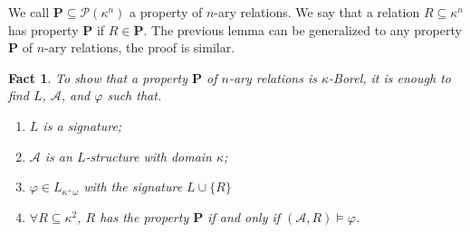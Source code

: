 \documentclass[12pt,a4paper]{amsart}
\newtheorem{fact}[thm]{Fact}
\theoremstyle{definition}
\theoremstyle{remark}
\begin{document}
We call $\mathbf{P}\subseteq\mathcal{P}(\kappa^n)$ a property of $n$-ary relations. We say that a relation $R\subseteq \kappa^n$ has  property $\mathbf{P}$  if $R\in \mathbf{P}$.
The previous lemma can be generalized to any  property $\mathbf{P}$ of $n$-ary relations, the proof is similar.

\begin{fact}
    To show that a property $\mathbf{P}$ of $n$-ary relations is $\kappa$-Borel, it is enough to find $L$, $\mathcal{A}$, and $\varphi$ such that.
    \begin{enumerate}
        \item $L$ is a signature;
        \item $\mathcal{A}$ is an $L$-structure with domain $\kappa$;
        \item $\varphi\in L_{\kappa^+\omega}$ with the signature $L\cup \{R\}$
        \item $\forall R\subseteq \kappa^2$, $R$ has the property $\mathbf{P}$ if and only if $(\mathcal{A},R)\models \varphi$.
    \end{enumerate}
\end{fact}
\end{document}
